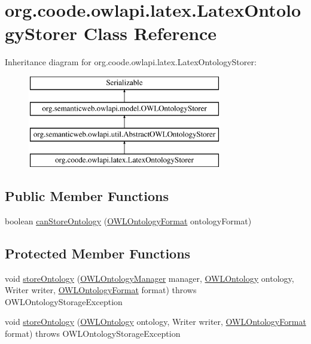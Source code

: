 \hypertarget{classorg_1_1coode_1_1owlapi_1_1latex_1_1_latex_ontology_storer}{\section{org.\-coode.\-owlapi.\-latex.\-Latex\-Ontology\-Storer Class Reference}
\label{classorg_1_1coode_1_1owlapi_1_1latex_1_1_latex_ontology_storer}
}
Inheritance diagram for org.\-coode.\-owlapi.\-latex.\-Latex\-Ontology\-Storer\-:\begin{figure}[H]
\begin{center}
\leavevmode
\includegraphics[height=4.000000cm]{classorg_1_1coode_1_1owlapi_1_1latex_1_1_latex_ontology_storer}
\end{center}
\end{figure}
\subsection*{Public Member Functions}
\begin{DoxyCompactItemize}
\item 
boolean \hyperlink{classorg_1_1coode_1_1owlapi_1_1latex_1_1_latex_ontology_storer_ab76e1ab1f2084a2c0646b923fffd9b87}{can\-Store\-Ontology} (\hyperlink{classorg_1_1semanticweb_1_1owlapi_1_1model_1_1_o_w_l_ontology_format}{O\-W\-L\-Ontology\-Format} ontology\-Format)
\end{DoxyCompactItemize}
\subsection*{Protected Member Functions}
\begin{DoxyCompactItemize}
\item 
void \hyperlink{classorg_1_1coode_1_1owlapi_1_1latex_1_1_latex_ontology_storer_a5ba129ef3cf0990356d02c3927946c6c}{store\-Ontology} (\hyperlink{interfaceorg_1_1semanticweb_1_1owlapi_1_1model_1_1_o_w_l_ontology_manager}{O\-W\-L\-Ontology\-Manager} manager, \hyperlink{interfaceorg_1_1semanticweb_1_1owlapi_1_1model_1_1_o_w_l_ontology}{O\-W\-L\-Ontology} ontology, Writer writer, \hyperlink{classorg_1_1semanticweb_1_1owlapi_1_1model_1_1_o_w_l_ontology_format}{O\-W\-L\-Ontology\-Format} format)  throws O\-W\-L\-Ontology\-Storage\-Exception 
\item 
void \hyperlink{classorg_1_1coode_1_1owlapi_1_1latex_1_1_latex_ontology_storer_a0c9db43f04616ca30a59dedc264f28ee}{store\-Ontology} (\hyperlink{interfaceorg_1_1semanticweb_1_1owlapi_1_1model_1_1_o_w_l_ontology}{O\-W\-L\-Ontology} ontology, Writer writer, \hyperlink{classorg_1_1semanticweb_1_1owlapi_1_1model_1_1_o_w_l_ontology_format}{O\-W\-L\-Ontology\-Format} format)  throws O\-W\-L\-Ontology\-Storage\-Exception 
\end{DoxyCompactItemize}

